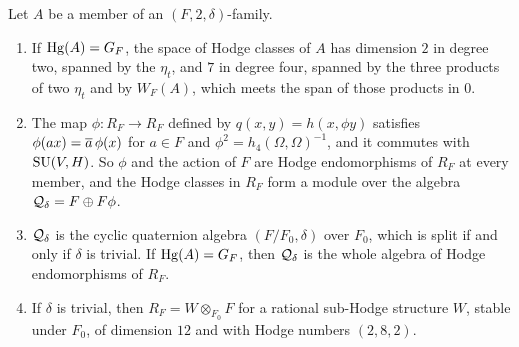 \begin{proposition}
\label{prop:quarticquat}
Let $A$ be a member of an $(F,2,\delta)$-family.
\begin{enumerate}[label=\textup{(\roman*)},leftmargin=2.6em,itemsep=2pt]
\item If $\operatorname{Hg}(A)=G_{F}$, the space of Hodge classes of $A$ has dimension $2$
  in degree two, spanned by the $\eta_{t}$, and $7$ in degree four, spanned by
  the three products of two $\eta_{t}$ and by $W_{F}(A)$, which meets the span
  of those products in $0$.
\item The map $\phi\colon R_{F}\to R_{F}$ defined by $q(x,y)=h(x,\phi y)$
  satisfies $\phi(ax)=\overline{a}\,\phi(x)$ for $a\in F$ and
  $\phi^{2}=h_{4}(\Omega,\Omega)^{-1}$, and it commutes with $\operatorname{SU}(V,H)$. So
  $\phi$ and the action of $F$ are Hodge endomorphisms of $R_{F}$ at every
  member, and the Hodge classes in $R_{F}$ form a module over the algebra
  $\mathcal{Q}_{\delta}=F\oplus F\phi$.
\item $\mathcal{Q}_{\delta}$ is the cyclic quaternion algebra $(F/F_{0},\delta)$ over
  $F_{0}$, which is split if and only if $\delta$ is trivial. If
  $\operatorname{Hg}(A)=G_{F}$, then $\mathcal{Q}_{\delta}$ is the whole algebra of Hodge
  endomorphisms of $R_{F}$.
\item If $\delta$ is trivial, then $R_{F}=W\otimes_{F_{0}}F$ for a rational
  sub-Hodge structure $W$, stable under $F_{0}$, of dimension $12$ and with
  Hodge numbers $(2,8,2)$.
\end{enumerate}
\end{proposition}

